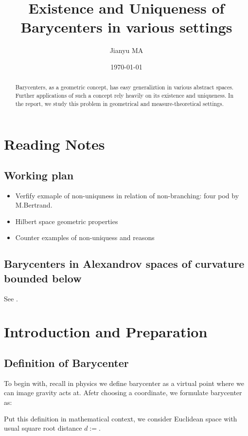 \documentclass{report}
\begin{document}
\author{Jianyu MA}
\date{\today}
\title{Existence and Uniqueness of Barycenters in various settings}
\maketitle

\begin{abstract}
	Barycenters, as a geometric concept, has easy generaliztion in various abstract spaces. Further applications of such a concept rely heavily on its existence and uniqueness. In the report, we study this problem in geometrical and measure-theoretical settings.
\end{abstract}

\tableofcontents

\chapter{Reading Notes}
\section{Working plan}
\begin{itemize}
	\item Verfify exmaple of non-uniquness in relation of non-branching: four pod by M.Bertrand.
	\item Hilbert space geometric properties
	\item Counter examples of non-uniquess and reasons
\end{itemize}
\section{Barycenters in Alexandrov spaces of curvature bounded below}
See \cite{ohta2012barycenters}.


\chapter{Introduction and Preparation}
\section{Definition of Barycenter}
To begin with, recall in physics we define barycenter as a virtual point where we can image gravity acts at. Afetr choosing a coordinate, we formulate barycenter as:

Put this definition in mathematical context, we consider Euclidean space with usual square root distance $d:=$.
\end{document}
